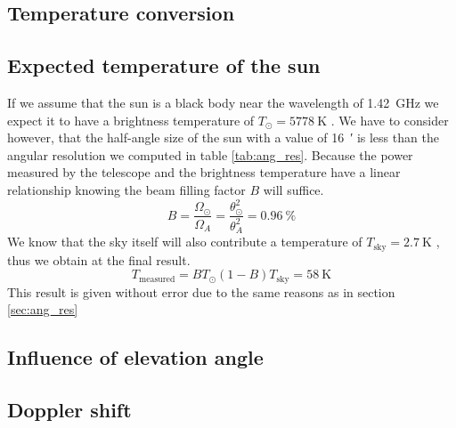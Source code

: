 \subsection{Temperature conversion}

\subsection{Expected temperature of the sun}\label{sec:temp}
If we assume that the sun is a black body near the wavelength of \SI{1.42}{\giga\hertz} we expect it to have a brightness temperature of $T_{\odot} = \SI{5778}{\kelvin}$ \cite[p. 211]{ftb}.
We have to consider however, that the half-angle size of the sun with a value of \SI{16}{\arcminute} \cite[p. 211]{ftb} is less than the angular resolution we computed in table \ref{tab:ang_res}.
Because the power measured by the telescope and the brightness temperature have a linear relationship knowing the beam filling factor $B$ will suffice.
\begin{equation}
    B = \frac{\Omega_{\odot}}{\Omega_A} = \frac{\theta_{\odot}^2}{\theta_A^2} = \SI{0.96
    }{\percent}
\end{equation}
We know that the sky itself will also contribute a temperature of $T_{\text{sky}} = \SI{2.7}{\kelvin}$ \cite[p. 4]{script}, thus we obtain at the final result.
\begin{equation}
    T_{\text{measured}} = B T_{\odot} (1-B) T_{\text{sky}} = \SI{58}{\kelvin}
\end{equation}
This result is given without error due to the same reasons as in section \ref{sec:ang_res}


\subsection{Influence of elevation angle}

\subsection{Doppler shift}